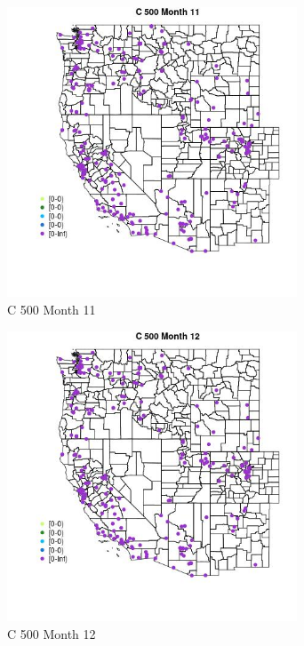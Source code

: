 \begin{figure} 
\centering  
\includegraphics[width=0.77\textwidth]{Code_Outputs/Report_ML_input_PM25_Step4_part_e_de_duplicated_aveswNAs_MapObsMo11C_500.jpg} 
\caption{\label{fig:Report_ML_input_PM25_Step4_part_e_de_duplicated_aveswNAsMapObsMo11C_500}C 500 Month 11} 
\end{figure} 
 

\begin{figure} 
\centering  
\includegraphics[width=0.77\textwidth]{Code_Outputs/Report_ML_input_PM25_Step4_part_e_de_duplicated_aveswNAs_MapObsMo12C_500.jpg} 
\caption{\label{fig:Report_ML_input_PM25_Step4_part_e_de_duplicated_aveswNAsMapObsMo12C_500}C 500 Month 12} 
\end{figure} 
 

